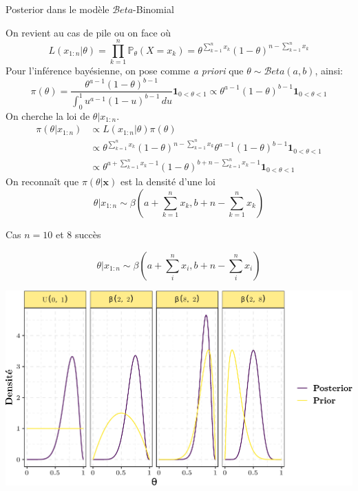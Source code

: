 \documentclass[9pt,ignorenonframetext,]{beamer}
\begin{document}
\begin{frame}{Posterior dans le modèle \(\mathcal{B}eta\)-Binomial}
\protect\hypertarget{posterior-dans-le-moduxe8le-mathcalbeta-binomial}{}

On revient au cas de pile ou on face où
\[L(x_{1:n}\vert \theta) = \prod_{k = 1}^{n}\mathbb{P}_\theta(X = x_k) = \theta^{\sum_{k=1}^n x_k}\left(1 - \theta \right)^{n - \sum_{k=1}^n x_k}\]
\pause Pour l'inférence bayésienne, on pose comme \emph{a priori} que
\(\theta \sim \mathcal{B}eta(a, b)\), ainsi:
\[\pi(\theta) = \frac {\theta^{a -1}(1-\theta)^{b -1}}{\int _{0}^{1}u^{a -1}(1-u)^{b -1}\,du}\mathbf{1}_{0 < \theta < 1} \propto \theta^{a -1}(1-\theta)^{b -1}\mathbf{1}_{0 < \theta < 1}\]
On cherche la loi de \(\theta \vert x_{1:n}\).\pause \begin{align*}
\pi(\theta \vert x_{1:n}) &\propto L(x_{1:n}\vert \theta)\pi(\theta)\\
&\propto \theta^{\sum_{k=1}^n x_k}\left(1 - \theta \right)^{n - \sum_{k=1}^n x_k} \theta^{a -1}(1-\theta)^{b -1}\mathbf{1}_{0 < \theta < 1}\\
&\propto \theta^{a + \sum_{k=1}^n x_k - 1}(1-\theta)^{b + n - \sum_{k=1}^n x_k -1}\mathbf{1}_{0 < \theta < 1}
\end{align*} \pause On reconnaît que \(\pi(\theta\vert \mathbf{x})\) est
la densité d'une loi
\[\theta\vert x_{1:n} \sim \beta\left(a + \sum_{k = 1}^n x_k, b + n - \sum_{k = 1}^n x_k\right)\]

\end{frame}

\begin{frame}{Cas \(n = 10\) et 8 succès}
\protect\hypertarget{cas-n-10-et-8-succuxe8s}{}

\[\theta\vert x_{1:n} \sim \beta\left(a + \sum_{i}^n x_i, b + n - \sum_{i}^n x_i\right)\]

\includegraphics{diapos_inference_bayesienne_files/figure-beamer/plot_prior_posterior_small_samp-1.pdf}

\end{frame}
\end{document}
